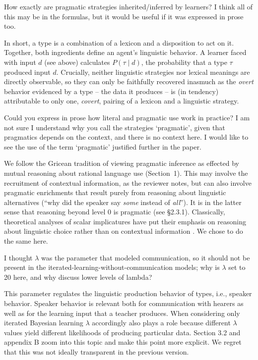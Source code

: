 \documentclass[12pt,a4paper]{article}
\begin{document}
\vspace{.5cm}
\begin{mdframed}[backgroundcolor=gray!25,linecolor=gray!25]
How exactly are pragmatic strategies inherited/inferred by learners?    I think all of this may be in the formulas, but it would be useful if it was expressed in prose too.
\end{mdframed}
In short, a type is a combination of a lexicon and a disposition to act on it. Together, both ingredients define an agent's linguistic behavior. A learner faced with input $d$ (see above) calculates $P(\tau \mid d)$, the probability that a type $\tau$ produced input $d$. Crucially, neither linguistic strategies nor lexical meanings are directly observable, so they can only be faithfully recovered inasmuch as the {\em overt} behavior evidenced by a type -- the data it produces -- is (in tendency) attributable to only one, {\em covert}, pairing of a lexicon and a linguistic strategy.

\vspace{.5cm}
\begin{mdframed}[backgroundcolor=gray!25,linecolor=gray!25]
Could you express in prose how literal and pragmatic use work in practice? I am not sure I understand why you call the strategies `pragmatic', given that pragmatics depends on the context, and there is no context here. I would like to see the use of the term `pragmatic' justified further in the paper.
\end{mdframed}
We follow the Gricean tradition of viewing pragmatic inference as effected by mutual reasoning about rational language use (Section~1). This may involve the recruitment of contextual information, as the reviewer notes, but can also involve pragmatic enrichments that result purely from reasoning about linguistic alternatives (``why did the speaker say {\em some} instead of {\em all}''). It is in the latter sense that reasoning beyond level $0$ is pragmatic (see \S2.3.1). Classically, theoretical analyses of scalar implicatures have put their emphasis on reasoning about linguistic choice rather than on contextual information \citep[e.g.,][]{horn:1972,gazdar:1979, franke:2009, GoodmanStuhlmuller2013:Knowledge-and-I}. We chose to do the same here.

\vspace{.5cm}
\begin{mdframed}[backgroundcolor=gray!25,linecolor=gray!25]
I thought $\lambda$ was the parameter that modeled communication, so it should not be present in the iterated-learning-without-communication models; why is $\lambda$ set to 20 here, and why discuss lower levels of lambda? 
\end{mdframed}
This parameter regulates the linguistic production behavior of types, i.e., speaker
behavior. Speaker behavior is relevant both for communication with hearers as well as for the
learning input that a teacher produces. When considering only iterated Bayesian learning
$\lambda$ accordingly also plays a role because different $\lambda$ values yield different
likelihoods of producing particular data. Section 3.2 and appendix B zoom into this topic and
make this point more explicit. We regret that this was not ideally transparent in the previous
version.
\end{document}
